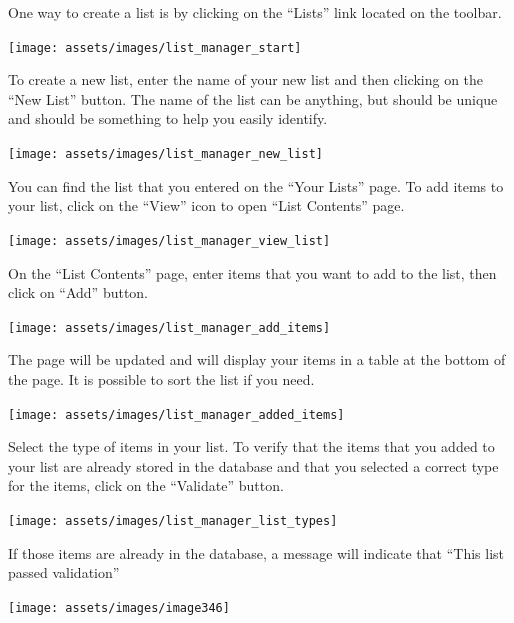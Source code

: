 \documentclass[
  12pt,
]{book}
\begin{document}
One way to create a list is by clicking on the ``Lists'' link located on the toolbar.

\begin{center}\texttt{[image: assets/images/list\_manager\_start]} \end{center}

To create a new list, enter the name of your new list and then clicking on the ``New List'' button. The name of the list can be anything, but should be unique and should be something to help you easily identify.

\begin{center}\texttt{[image: assets/images/list\_manager\_new\_list]} \end{center}

You can find the list that you entered on the ``Your Lists'' page. To add items to your list, click on the ``View'' icon to open ``List Contents'' page.

\begin{center}\texttt{[image: assets/images/list\_manager\_view\_list]} \end{center}

On the ``List Contents'' page, enter items that you want to add to the list, then click on ``Add'' button.

\begin{center}\texttt{[image: assets/images/list\_manager\_add\_items]} \end{center}

The page will be updated and will display your items in a table at the bottom of the page. It is possible to sort the list if you need.

\begin{center}\texttt{[image: assets/images/list\_manager\_added\_items]} \end{center}

Select the type of items in your list. To verify that the items that you added to your list are already stored in the database and that you selected a correct type for the items, click on the ``Validate'' button.

\begin{center}\texttt{[image: assets/images/list\_manager\_list\_types]} \end{center}

If those items are already in the database, a message will indicate that ``This list passed validation''

\begin{center}\texttt{[image: assets/images/image346]} \end{center}
\end{document}
